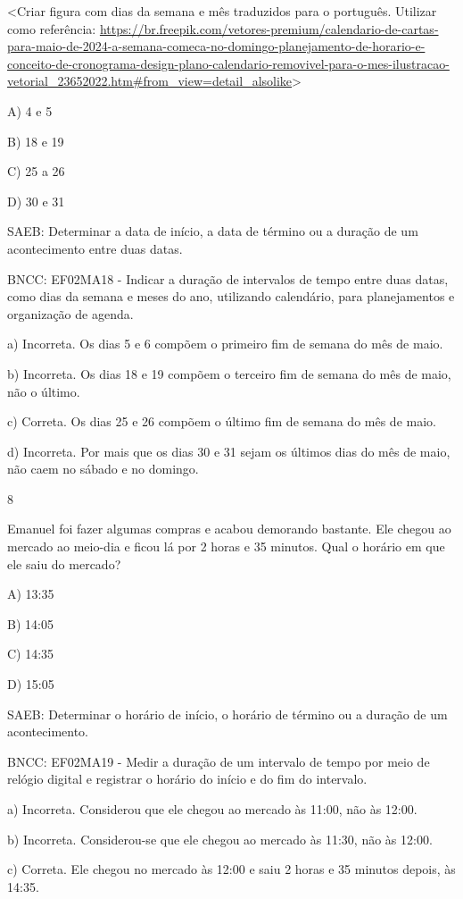 \begin{escolha}
\begin{escolha}
{{{{{{{{\textless{}Criar figura com dias da semana e mês traduzidos para o
português. Utilizar como referência:
\url{https://br.freepik.com/vetores-premium/calendario-de-cartas-para-maio-de-2024-a-semana-comeca-no-domingo-planejamento-de-horario-e-conceito-de-cronograma-design-plano-calendario-removivel-para-o-mes-ilustracao-vetorial_23652022.htm\#from_view=detail_alsolike}\textgreater{}

A) 4 e 5

B) 18 e 19

C) 25 a 26

D) 30 e 31

SAEB: Determinar a data de início, a data de término ou a
duração de um acontecimento entre duas datas.

BNCC: EF02MA18 - Indicar a duração de intervalos de tempo entre
duas datas, como dias da semana e meses do ano, utilizando calendário,
para planejamentos e organização de agenda.

a) Incorreta. Os dias 5 e 6 compõem o primeiro fim de semana do mês de maio.

b) Incorreta. Os dias 18 e 19 compõem o terceiro fim de semana do mês de maio, não o último.

c) Correta. Os dias 25 e 26 compõem o último fim de semana do mês de maio.

d) Incorreta. Por mais que os dias 30 e 31 sejam os últimos dias do mês
de maio, não caem no sábado e no domingo.

\num{8}

Emanuel foi fazer algumas compras e acabou demorando bastante. Ele chegou ao mercado ao meio-dia e ficou lá por 2 horas e 35 minutos. Qual
o horário em que ele saiu do mercado?

A) 13:35

B) 14:05

C) 14:35

D) 15:05

SAEB: Determinar o horário de início, o horário de término ou a
duração de um acontecimento.

BNCC: EF02MA19 - Medir a duração de um intervalo de tempo por meio de
relógio digital e registrar o horário do início e do fim do intervalo.

a) Incorreta. Considerou que ele chegou ao mercado às 11:00, não às 12:00.

b) Incorreta. Considerou-se que ele chegou ao mercado às 11:30, não às 12:00.

c) Correta. Ele chegou no mercado às 12:00 e saiu 2 horas e 35 minutos
depois, às 14:35.

}}}}}}}}
\end{escolha}
\end{escolha}
